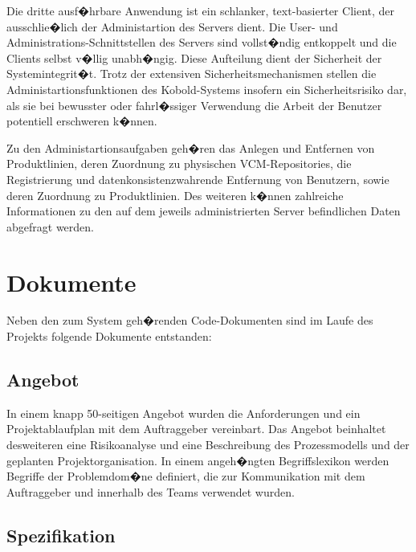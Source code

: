 \documentclass[a4paper,titlepage,12pt,ngerman]{scrbook}
\begin{document}
Die dritte ausf�hrbare Anwendung ist ein schlanker, text-basierter Client, der ausschlie�lich der Administartion
des Servers dient. Die User- und Administrations-Schnittstellen des Servers sind vollst�ndig entkoppelt und die 
Clients selbst v�llig unabh�ngig. Diese Aufteilung dient der Sicherheit der Systemintegrit�t. Trotz der extensiven 
Sicherheitsmechanismen stellen die Administartionsfunktionen des Kobold-Systems insofern ein Sicherheitsrisiko dar, 
als sie bei bewusster oder fahrl�ssiger Verwendung die Arbeit der Benutzer potentiell erschweren k�nnen.\par

Zu den Administartionsaufgaben geh�ren das Anlegen und Entfernen von Produktlinien, deren Zuordnung zu physischen 
VCM-Repositories, die Registrierung und datenkonsistenzwahrende Entfernung von Benutzern, sowie deren Zuordnung 
zu Produktlinien. Des weiteren k�nnen zahlreiche Informationen zu den auf dem jeweils administrierten Server
befindlichen Daten abgefragt werden.

 
\section{Dokumente}

Neben den zum System geh�renden Code-Dokumenten sind im Laufe des Projekts 
folgende Dokumente entstanden:

\subsection{Angebot}
\label{angebot}

In einem knapp 50-seitigen Angebot wurden die Anforderungen und ein
Projektablaufplan mit dem Auftraggeber vereinbart. Das Angebot
beinhaltet desweiteren eine Risikoanalyse und eine Beschreibung des
Prozessmodells und der geplanten Projektorganisation. In einem
angeh�ngten Begriffslexikon werden Begriffe der Problemdom�ne
definiert, die zur Kommunikation mit dem Auftraggeber und innerhalb
des Teams verwendet wurden.

\subsection{Spezifikation}
\end{document}
